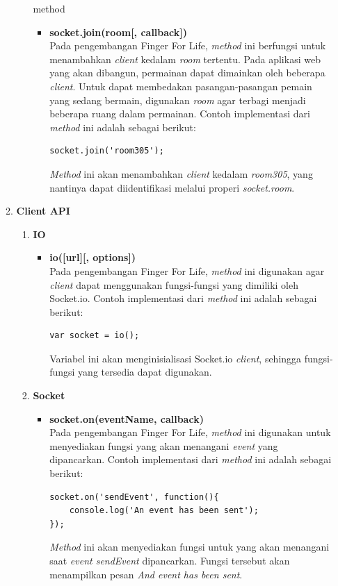 \begin{enumerate}
\begin{enumerate}
\begin{enumerate}
\begin{itemize}
			\end{itemize}
		
			method
			\begin{itemize}
				\item \textbf{socket.join(room[, callback])} \\
				Pada pengembangan Finger For Life, \textit{method} ini berfungsi untuk menambahkan \textit{client} kedalam \textit{room} tertentu. Pada aplikasi web yang akan dibangun, permainan dapat dimainkan oleh beberapa \textit{client}. Untuk dapat membedakan pasangan-pasangan pemain yang sedang bermain, digunakan \textit{room} agar terbagi menjadi beberapa ruang dalam permainan. Contoh implementasi dari \textit{method} ini adalah sebagai berikut:
\begin{lstlisting}
socket.join('room305');
\end{lstlisting}
\textit{Method} ini akan menambahkan \textit{client} kedalam \textit{room305}, yang nantinya dapat diidentifikasi melalui properi \textit{socket.room}.

			\end{itemize}
		\end{enumerate}
	
		
		\item \textbf{Client API}
		\begin{enumerate}
			\item \textbf{IO}
			\begin{itemize}
				\item \textbf{io([url][, options])} \\
				Pada pengembangan Finger For Life, \textit{method} ini digunakan agar \textit{client} dapat menggunakan fungsi-fungsi yang dimiliki oleh Socket.io. Contoh implementasi dari \textit{method} ini adalah sebagai berikut:
\begin{lstlisting}
var socket = io();
\end{lstlisting}
Variabel ini akan menginisialisasi Socket.io \textit{client}, sehingga fungsi-fungsi yang tersedia dapat digunakan.

			\end{itemize}
		
			\item \textbf{Socket}
			\begin{itemize}
				\item \textbf{socket.on(eventName, callback)} \\
				Pada pengembangan Finger For Life, \textit{method} ini digunakan untuk menyediakan fungsi yang akan menangani \textit{event} yang dipancarkan. Contoh implementasi dari \textit{method} ini adalah sebagai berikut:
\begin{lstlisting}
socket.on('sendEvent', function(){
	console.log('An event has been sent');
});
\end{lstlisting}
\textit{Method} ini akan menyediakan fungsi untuk yang akan menangani saat \textit{event sendEvent} dipancarkan. Fungsi tersebut akan menampilkan pesan \textit{And event has been sent}.
				

\end{itemize}
\end{enumerate}
\end{enumerate}
\end{enumerate}
